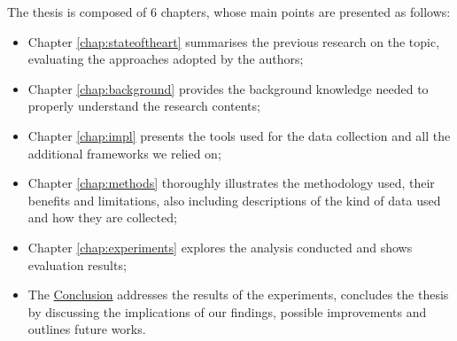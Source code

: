 The thesis is composed of 6 chapters, whose main points are presented as follows:
\begin{itemize}
	\item Chapter \ref{chap:stateoftheart} summarises the previous research 
	on the topic, evaluating the approaches adopted by the authors;
	
	\item Chapter \ref{chap:background} provides the background knowledge 
	needed to properly understand the research contents;
	
	\item Chapter \ref{chap:impl} presents the tools used for the data collection 
	and all the additional frameworks we relied on;
		
	\item Chapter \ref{chap:methods} thoroughly illustrates the methodology used, 
	their benefits and limitations, also including descriptions of the kind of data 
	used and how they are collected;

	\item Chapter \ref{chap:experiments} explores the analysis conducted and 
	shows evaluation results;	
	
	\item The \hyperref[chap:concl]{Conclusion} addresses the results of the 
	experiments, concludes the thesis by discussing the implications of our findings, 
	possible improvements and outlines future works.
	
\end{itemize}


